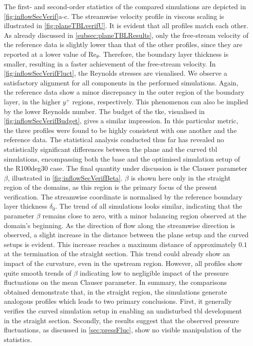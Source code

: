 The first- and second-order statistics of the compared simulations are depicted in \autoref{fig:inflowSecVerif}a-c.
The streamwise velocity profile in viscous scaling is illustrated in \autoref{fig:planeTBLverifU}.
It is evident that all profiles match each other. 
As already discussed in \autoref{subsec:planeTBLResults}, only the free-stream velocity of the reference data is slightly lower than that of the other profiles, since they are reported at a lower value of $\mathrm{Re}_{\theta}$.
Therefore, the boundary layer thickness is smaller, resulting in a faster achievement of the free-stream velocity.
In \autoref{fig:inflowSecVerifFluct}, the Reynolds stresses are visualised. 
We observe a satisfactory alignment for all components in the performed simulations.
Again, the reference data show a minor discrepancy in the outer region of the boundary layer, in the higher $y^+$ regions, respectively.
This phenomenon can also be implied by the lower Reynolds number.
The budget of the \acrshort{tke}, visualised in \autoref{fig:inflowSecVerifBudget}, gives a similar impression.
In this particular metric, the three profiles were found to be highly consistent with one another and the reference data.
The statistical analysis conducted thus far has revealed no statistically significant differences between the plane and the curved \acrshort{tbl} simulations, encompassing both the base and the optimised simulation setup of the R100deg30 case.
The final quantity under discussion is the Clauser parameter $\beta$, illustrated in \autoref{fig:inflowSecVerifBeta}.
$\beta$ is shown here only in the straight region of the domains, as this region is the primary focus of the present verification.
The streamwise coordinate is normalised by the reference boundary layer thickness $\delta_0$.
The trend of all simulations looks similar, indicating that the parameter $\beta$ 
remains close to zero, with a minor balancing region observed at the domain's beginning. 
As the direction of flow along the streamwise direction is observed, a slight increase in the distance between the plane setup and the curved setups is evident. This increase reaches a maximum distance of approximately $0.1$ at the termination of the straight section.
This trend could already show an impact of the curvature, even in the upstream region.
However, all profiles show quite smooth trends of $\beta$ indicating low to negligible impact of the pressure fluctuations on the mean Clauser parameter.
In summary, the comparisons obtained demonstrate that, in the straight region, the simulations generate analogous profiles which leads to two primary conclusions.
First, it generally verifies the curved simulation setup in enabling an undisturbed \acrshort{tbl} development in the straight section.
Secondly, the results suggest that the observed pressure fluctuations, as discussed in \autoref{sec:pressFluc}, show no visible manipulation of the statistics.



